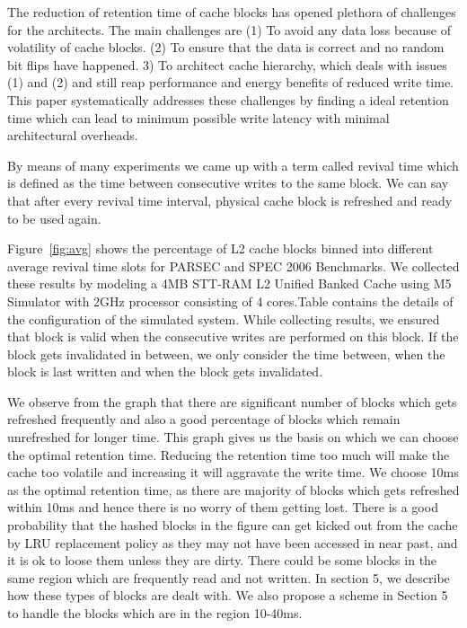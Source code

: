 The reduction of retention time of cache blocks has opened plethora of challenges for the architects. The main challenges are (1) To avoid any data loss because of volatility of cache blocks. (2) To ensure that the data is correct and no random bit flips have happened. 3) To architect cache hierarchy, which deals with issues (1) and (2) and still reap performance and energy benefits of reduced write time. This paper systematically addresses these challenges by finding a ideal retention time which can lead to minimum possible write latency with minimal architectural overheads.

By means of many experiments we came up with a term called revival time which is defined as  the time between consecutive writes to the same block. We can say that after every revival time interval, physical cache block is refreshed and ready to be used again. 

Figure~\ref{fig:avg}  shows the percentage of L2 cache blocks binned into different average revival time slots for PARSEC and SPEC 2006 Benchmarks. We collected these results by modeling a 4MB STT-RAM L2 Unified Banked Cache using M5 Simulator with 2GHz processor consisting of 4 cores.Table contains the details of the configuration of the simulated system. While collecting results, we ensured that block is valid when the consecutive writes are performed on this block. If the block gets invalidated in between, we only consider the time between, when the block is last written and when the block gets invalidated. 

We observe from the graph that there are significant number of blocks which gets refreshed frequently and also a good percentage of blocks which remain unrefreshed for longer time. This graph gives us the basis on which we can choose the optimal retention time. Reducing the retention time too much will make the cache too volatile and increasing it will aggravate the write time.  We choose 10ms as the optimal retention time, as there are majority of blocks which gets refreshed within 10ms and hence there is no worry of them getting lost. There is a good probability that the hashed blocks in the figure can get kicked out from the cache by LRU replacement policy as they may not have been accessed in near past, and it is ok to loose them unless they are dirty. There could be some blocks in the same region which are frequently read and not written. In section 5, we describe how these types of blocks are dealt with. We also propose a scheme in Section 5 to handle the blocks which are in the region 10-40ms. 




